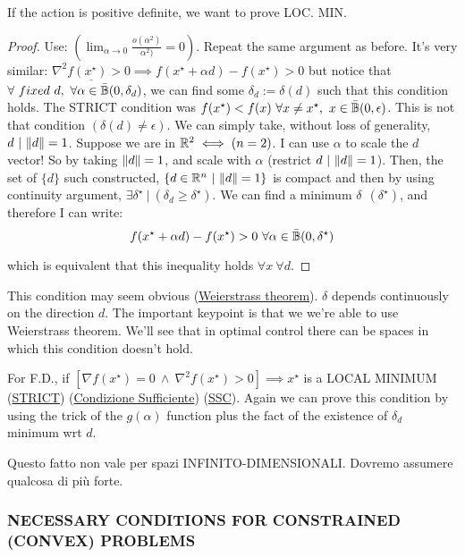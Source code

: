 If the action is positive definite, we want to prove LOC. MIN.

\begin{proof}
Use: $(\lim_{\alpha\to 0}{\frac{o(\alpha^2)}{\alpha^2)}} = 0)$. Repeat the same argument as before. It's very similar: $\underline{\nabla^2{f(x^\star)} > 0} \implies f(x^\star +\alpha d) -f(x^\star) > 0$ but notice that $\forall\ fixed\ d,\ \forall \alpha \in \bar{\mathbb{B}}(0,\delta_d)$, we can find some $\delta_d := \delta(d)$ such that this condition holds. The STRICT condition was $f(x^\star) < f(x)\ \forall x\neq x^\star,\ x \in \bar{\mathbb{B}}(0,\epsilon)$. This is not that condition $(\delta(d)\neq \epsilon)$. We can simply take, without loss of generality, $d\ |\ \lVert d\rVert = 1$. Suppose we are in $\mathbb{R}^2 \iff (n=2)$. I can use $\alpha$ to scale the $d$ vector! So by taking $\lVert d\rVert=1$, and scale with $\alpha$ (restrict $d\ |\ \lVert d\rVert=1$). Then, the set of $\{d\}$ such constructed, $\{d \in \mathbb{R}^n\ |\ \lVert d\rVert = 1\}$ is compact and then by using continuity argument, $\exists \delta^\star\ |\ (\delta_d \geq \delta^\star)$. We can find a minimum $\delta\ \ (\delta^\star)$, and therefore I can write:
\[
	f(x^\star +\alpha d) - f(x^\star) > 0\ \forall \alpha \in \bar{\mathbb{B}}(0,\delta^\star)
\]	

which is equivalent that this inequality holds $\forall x\ \forall d$.
\end{proof}

This condition may seem obvious (\underline{Weierstrass theorem}). $\delta$ depends continuously on the direction $d$. The important keypoint is that we we're able to use Weierstrass theorem. We'll see that in optimal control there can be spaces in which this condition doesn't hold.

For F.D., if $[\nabla{f(x^\star)} = 0\ \land\ \nabla^2{f(x^\star)} > 0] \implies x^\star$ is a LOCAL MINIMUM (\underline{STRICT}) (\underline{Condizione Sufficiente}) (\underline{SSC}). Again we can prove this condition by using the trick of the $g(\alpha)$ function plus the fact of the existence of $\delta_d$ minimum wrt $d$.

Questo fatto non vale per spazi INFINITO-DIMENSIONALI. Dovremo assumere qualcosa di più forte.

\subsubsection{NECESSARY CONDITIONS FOR CONSTRAINED (CONVEX) PROBLEMS}

